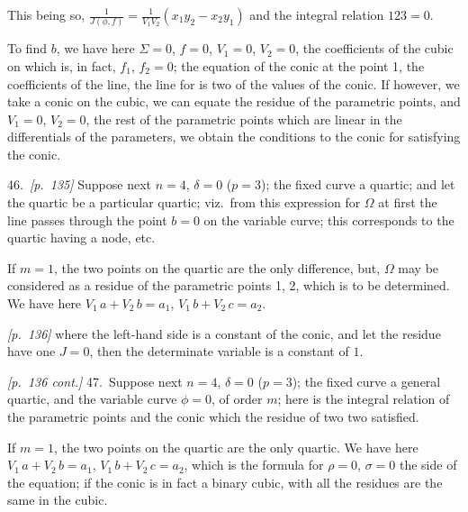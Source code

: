 \documentclass[11pt,a4paper]{book}
\begin{document}
This being so, $\frac{1}{J(\phi, f)} = \frac{1}{V_1 V_2}(x_1 y_2 - x_2 y_1)$ and the integral relation $123 = 0$.

To find $b$, we have here $\Sigma = 0$, $f = 0$, $V_1 = 0$, $V_2 = 0$, the coefficients of the cubic on which is, in fact, $f_1$, $f_2 = 0$; the equation of the conic at the point 1, the coefficients of the line, the line for is two of the values of the conic. If however, we take a conic on the cubic, we can equate the residue of the parametric points, and $V_1 = 0$, $V_2 = 0$, the rest of the parametric points which are linear in the differentials of the parameters, we obtain the conditions to the conic for satisfying the conic.

\bigskip

46.\ \textit{[p.~135]} Suppose next $n = 4$, $\delta = 0$ ($p = 3$); the fixed curve a quartic; and let the quartic be a particular quartic; viz.\ from this expression for $\Omega$ at first the line passes through the point $b = 0$ on the variable curve; this corresponds to the quartic having a node, etc.

If $m = 1$, the two points on the quartic are the only difference, but, $\Omega$ may be considered as a residue of the parametric points 1, 2, which is to be determined. We have here $V_1\,a + V_2\,b = a_1$, $V_1\,b + V_2\,c = a_2$.

\bigskip\noindent\textit{[p.~136]} where the left-hand side is a constant of the conic, and let the residue have one $J = 0$, then the determinate variable is a constant of $1$.

\textit{[p.~136 cont.]} 47.\ Suppose next $n = 4$, $\delta = 0$ ($p = 3$); the fixed curve a general quartic, and the variable curve $\phi = 0$, of order $m$; here is the integral relation of the parametric points and the conic which the residue of two two satisfied.

If $m = 1$, the two points on the quartic are the only quartic. We have here $V_1\,a + V_2\,b = a_1$, $V_1\,b + V_2\,c = a_2$, which is the formula for $\rho = 0$, $\sigma = 0$ the side of the equation; if the conic is in fact a binary cubic, with all the residues are the same in the cubic.

\bigskip
\end{document}
